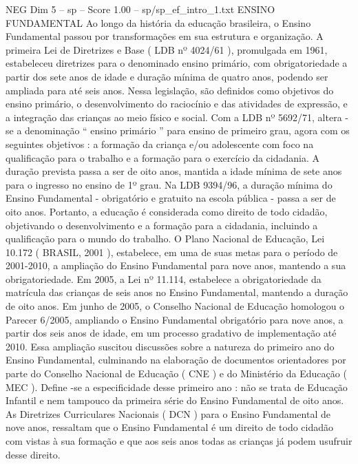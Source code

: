 \begin{textsample}{NEG Dim 5 – sp – Score 1.00 – sp/sp\_ef\_intro\_1.txt}  \label{ex:f5_neg_220}
ENSINO FUNDAMENTAL Ao longo da história da educação brasileira, o Ensino Fundamental passou por transformações em sua estrutura e organização.
A primeira Lei de Diretrizes e Base ( LDB nº 4024/61 ), promulgada em 1961, estabeleceu diretrizes para o denominado ensino primário, com obrigatoriedade a partir dos sete anos de idade e duração mínima de quatro anos, podendo ser ampliada para até seis anos.
Nessa legislação, são definidos como objetivos do ensino primário, o desenvolvimento do raciocínio e das atividades de expressão, e a integração das crianças ao meio físico e social.
Com a LDB nº 5692/71, altera -se a denominação “ ensino primário ” para ensino de primeiro grau, agora com os seguintes objetivos : a formação da criança e/ou adolescente com foco na qualificação para o trabalho e a formação para o exercício da cidadania.
A duração prevista passa a ser de oito anos, mantida a idade mínima de sete anos para o ingresso no ensino de 1º grau.
Na LDB 9394/96, a duração mínima do Ensino Fundamental - obrigatório e gratuito na escola pública - passa a ser de oito anos.
Portanto, a educação é considerada como direito de todo cidadão, objetivando o desenvolvimento e a formação para a cidadania, incluindo a qualificação para o mundo do trabalho.
O Plano Nacional de Educação, Lei 10.172 ( BRASIL, 2001 ), estabelece, em uma de suas metas para o período de 2001-2010, a ampliação do Ensino Fundamental para nove anos, mantendo a sua obrigatoriedade.
Em 2005, a Lei nº 11.114, estabelece a obrigatoriedade da matrícula das crianças de seis anos no Ensino Fundamental, mantendo a duração de oito anos.
Em junho de 2005, o Conselho Nacional de Educação homologou o Parecer 6/2005, ampliando o Ensino Fundamental obrigatório para nove anos, a partir dos seis anos de idade, em um processo gradativo de implementação até 2010.
Essa ampliação suscitou discussões sobre a natureza do primeiro ano do Ensino Fundamental, culminando na elaboração de documentos orientadores por parte do Conselho Nacional de Educação ( CNE ) e do Ministério da Educação ( MEC ).
Define -se a especificidade desse primeiro ano : não se trata de Educação Infantil e nem tampouco da primeira série do Ensino Fundamental de oito anos.
As Diretrizes Curriculares Nacionais ( DCN ) para o Ensino Fundamental de nove anos, ressaltam que o Ensino Fundamental é um direito de todo cidadão com vistas à sua formação e que aos seis anos todas as crianças já podem usufruir desse direito.

\end{textsample}
